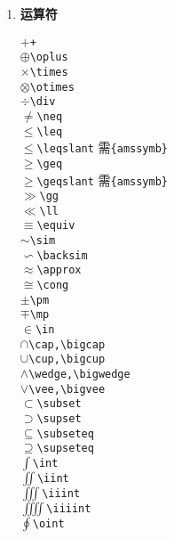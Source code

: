 \documentclass{article}
\newcommand{\q}{\quad}
\begin{document}
\begin{multicols}{2}
\begin{enumerate}
\item \textbf{运算符}
\vspace{-5mm}
\begin{multicols}{2} 
$ + $\q \verb|+| \\
$ \oplus $\q \verb|\oplus|\\
$ \times $\q \verb|\times| \\
$ \otimes $\q \verb|\otimes| \\
$ \div $\q \verb|\div| \\
$ \neq $\q \verb|\neq| \\
$ \leq $\q \verb|\leq| \\
$ \leqslant $\q \verb|\leqslant| {\footnotesize 需\verb|{amssymb}|} \\
$ \geq $\q \verb|\geq| \\
$ \geqslant $\q \verb|\geqslant| {\footnotesize 需\verb|{amssymb}|} \\
$ \gg $\q \verb|\gg| \\
$ \ll $\q \verb|\ll| \\
$ \equiv $\q \verb|\equiv| \\
$ \sim $\q \verb|\sim| \\
$ \backsim $\q \verb|\backsim| \\
$ \approx $\q \verb|\approx| \\
$ \cong $\q \verb|\cong| \\
$ \pm $\q \verb|\pm| \\
$ \mp $\q \verb|\mp| \\
$ \in $\q \verb|\in| \\
$ \cap $\q \verb|\cap,\bigcap| \\
$ \cup $\q \verb|\cup,\bigcup| \\
$ \wedge $\q \verb|\wedge,\bigwedge| \\
$ \vee $\q \verb|\vee,\bigvee| \\
$ \subset $\q \verb|\subset| \\
$ \supset $\q \verb|\supset| \\
$ \subseteq $\q \verb|\subseteq| \\
$ \supseteq $\q \verb|\supseteq| \\
$ \int $\q \verb|\int| \\
$ \iint $\q \verb|\iint| \\
$ \iiint $\q \verb|\iiint| \\
$ \iiiint $\q \verb|\iiiint| \\
$ \oint $\q \verb|\oint|  
\end{multicols}
\vspace{-5mm}

\end{enumerate}
\end{multicols}
\end{document}
